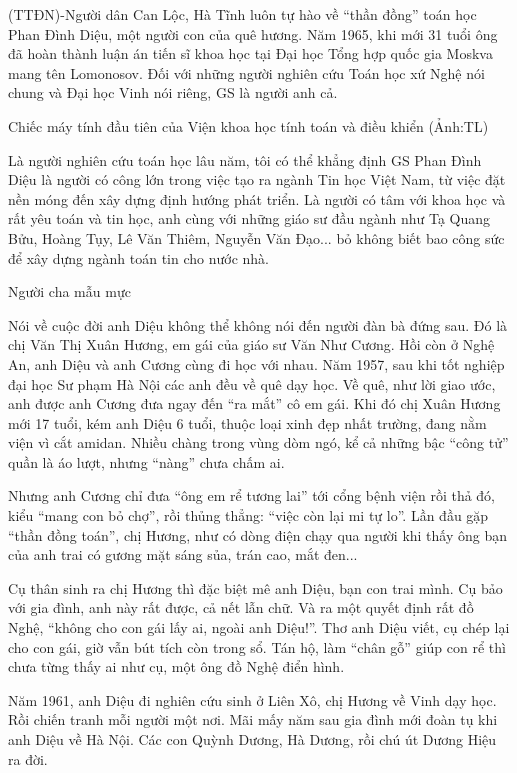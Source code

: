 
 
(TTĐN)-Người dân Can Lộc, Hà Tĩnh luôn tự hào về ``thần đồng'' toán học Phan Đình Diệu, một người con của quê hương. Năm 1965, khi mới 31 tuổi ông đã hoàn thành luận án tiến sĩ khoa học tại Đại học Tổng hợp quốc gia Moskva mang tên Lomonosov. Đối với những người nghiên cứu Toán học xứ Nghệ nói chung và Đại học Vinh nói riêng, GS là người anh cả.

Chiếc máy tính đầu tiên của Viện khoa học tính toán và điều khiển (Ảnh:TL)

Là người nghiên cứu toán học lâu năm, tôi có thể khẳng định GS Phan Đình Diệu là người có công lớn trong việc tạo ra ngành Tin học Việt Nam, từ việc đặt nền móng đến xây dựng định hướng phát triển. Là người có tâm với khoa học và rất yêu toán và tin học, anh cùng với những giáo sư đầu ngành như Tạ Quang Bửu, Hoàng  Tụy, Lê Văn Thiêm, Nguyễn Văn Đạo... bỏ không biết bao công sức để xây dựng ngành toán tin cho nước nhà.

Người cha mẫu mực

Nói về cuộc đời anh Diệu không thể không nói đến người đàn bà đứng sau. Đó là chị Văn Thị Xuân Hương, em gái của giáo sư Văn Như Cương. Hồi còn ở Nghệ An, anh Diệu và anh Cương cùng đi học với nhau. Năm 1957, sau khi tốt nghiệp đại học Sư phạm Hà Nội các anh đều về quê dạy học. Về quê, như lời giao ước, anh được anh Cương đưa ngay đến ``ra mắt'' cô em gái. Khi đó chị Xuân Hương mới 17 tuổi, kém anh Diệu 6 tuổi, thuộc loại xinh đẹp nhất trường, đang nằm viện vì cắt amidan. Nhiều chàng trong vùng dòm ngó, kể cả những bậc ``công tử'' quần là áo lượt, nhưng ``nàng'' chưa chấm ai.


Nhưng anh Cương chỉ đưa ``ông em rể tương lai'' tới cổng bệnh viện rồi thả đó, kiểu ``mang con bỏ chợ'', rồi thủng thẳng: ``việc còn lại mi tự lo''. Lần đầu gặp ``thần đồng toán'', chị Hương, như có dòng điện chạy qua người khi thấy ông bạn của anh trai có gương mặt sáng sủa, trán cao, mắt đen...

Cụ thân sinh ra chị Hương thì đặc biệt mê anh Diệu, bạn con trai mình. Cụ bảo với gia đình, anh này rất được, cả nết lẫn chữ. Và ra một quyết định rất đồ Nghệ, ``không cho con gái lấy ai, ngoài anh Diệu!''. Thơ anh Diệu viết, cụ chép lại cho con gái, giờ vẫn bút tích còn trong sổ. Tán hộ, làm ``chân gỗ'' giúp con rể thì chưa từng thấy ai như cụ, một ông đồ Nghệ điển hình.

Năm 1961, anh Diệu đi nghiên cứu sinh ở Liên Xô, chị Hương về Vinh dạy học. Rồi chiến tranh mỗi người một nơi. Mãi mấy năm sau gia đình mới đoàn tụ khi anh Diệu về Hà Nội. Các con Quỳnh Dương, Hà Dương, rồi chú út Dương Hiệu ra đời.

